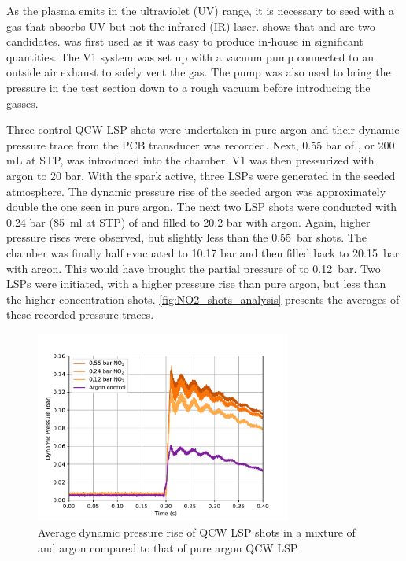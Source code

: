             As the plasma emits in the ultraviolet (UV) range, it is necessary to seed with a gas that absorbs UV but not the infrared (IR) laser. \textcite{khanGasDetectionUsing2019} shows that  and  are two candidates.  was first used as it was easy to produce in-house in significant quantities. The V1 system was set up with a vacuum pump connected to an outside air exhaust to safely vent the  gas. The pump was also used to bring the pressure in the test section down to a rough vacuum before introducing the gasses.


            Three control QCW LSP shots were undertaken in pure argon and their dynamic pressure trace from the PCB transducer was recorded. Next, 0.55 bar of , or 200 mL at STP, was introduced into the chamber. V1 was then pressurized with argon to 20 bar. With the spark active, three LSPs were generated in the seeded atmosphere. The dynamic pressure rise of the seeded argon was approximately double the one seen in pure argon. The next two LSP shots were conducted with 0.24 bar (\qty{85}{ml} at STP) of  and filled to 20.2 bar with argon. Again, higher pressure rises were observed, but slightly less than the \qty{0.55}{bar} shots. The chamber was finally half evacuated to 10.17 bar and then filled back to \qty{20.15}{bar} with argon. This would have brought the partial pressure of  to \qty{0.12}{bar}. Two LSPs were initiated, with a higher pressure rise than pure argon, but less than the higher concentration  shots. \autoref{fig:NO2_shots_analysis} presents the averages of these recorded pressure traces.

            \begin{figure}[!ht]
                \centering
                \includegraphics[width=0.75\textwidth]{assets/4 experiments/NO2_shots_analysis.pdf}
                \caption{Average dynamic pressure rise of QCW LSP shots in a mixture of  and argon compared to that of pure argon QCW LSP}
                \label{fig:NO2_shots_analysis}
            \end{figure}

